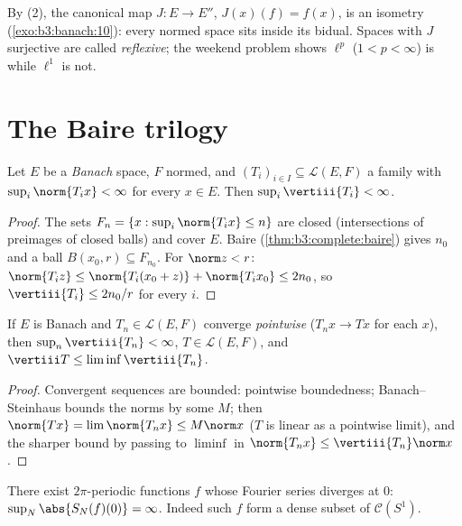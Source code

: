 \begin{remark}\label{rem:b3:banach:bidual}
By (2), the canonical map $J \colon E \to E''$, $J(x)(f) =
f(x)$, is an isometry (\cref{exo:b3:banach:10}): every normed
space sits inside its bidual. Spaces with $J$ surjective are
called \emph{reflexive}; the weekend
problem shows $\ell^p$ ($1 < p < \infty$) is  while
$\ell^1$ is not.
\end{remark}

\section{The Baire trilogy}

\begin{theorem}
\label{thm:b3:banach:banachsteinhaus}
Let $E$ be a \emph{Banach} space, $F$ normed, and $(T_i)_{i\in
I} \subseteq \mathcal L(E, F)$ a family with $\sup_i
\norm{T_ix} < \infty$ for every $x \in E$. Then $\sup_i
\vertiii{T_i} < \infty$.
\end{theorem}

\begin{proof}
The sets $F_n = \{x : \sup_i\norm{T_ix} \leq n\}$ are closed
(intersections of preimages of closed balls) and cover $E$.
Baire (\cref{thm:b3:complete:baire}) gives $n_0$ and a ball
$B(x_0, r) \subseteq F_{n_0}$. For $\norm z < r$: $\norm{T_iz}
\leq \norm{T_i(x_0 + z)} + \norm{T_ix_0} \leq 2n_0$, so
$\vertiii{T_i} \leq 2n_0/r$ for every $i$.
\end{proof}

\begin{corollary}\label{cor:b3:banach:bslimits}
If $E$ is Banach and $T_n \in \mathcal L(E,F)$ converge
\emph{pointwise} ($T_nx \to Tx$ for each $x$), then $\sup_n
\vertiii{T_n} < \infty$, $T \in \mathcal L(E, F)$, and
$\vertiii T \leq \liminf \vertiii{T_n}$.
\end{corollary}

\begin{proof}
Convergent sequences are bounded: pointwise boundedness;
Banach--Steinhaus bounds the norms by some $M$; then $\norm{Tx}
= \lim\norm{T_nx} \leq M\norm x$ ($T$ is linear as a pointwise
limit), and the sharper bound by passing to $\liminf$ in
$\norm{T_nx} \leq \vertiii{T_n}\norm x$.
\end{proof}

\begin{theorem}
\label{thm:b3:banach:fourierdiverge}
There exist  $2\pi$-periodic functions $f$ whose
Fourier series diverges at $0$: $\sup_N\abs{S_N(f)(0)} =
\infty$. Indeed such $f$ form a dense subset of $\mathcal
C(S^1)$.
\end{theorem}

